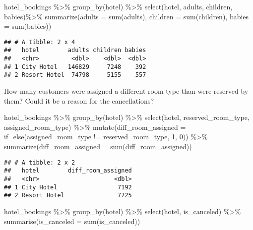 \documentclass[
]{article}
\newenvironment{Shaded}{\begin{snugshade}}{\end{snugshade}}
\newcommand{\AttributeTok}[1]{\textcolor[rgb]{0.77,0.63,0.00}{#1}}
\newcommand{\DecValTok}[1]{\textcolor[rgb]{0.00,0.00,0.81}{#1}}
\newcommand{\FunctionTok}[1]{\textcolor[rgb]{0.00,0.00,0.00}{#1}}
\newcommand{\NormalTok}[1]{#1}
\newcommand{\SpecialCharTok}[1]{\textcolor[rgb]{0.00,0.00,0.00}{#1}}
\begin{document}
\begin{Shaded}
\begin{Highlighting}[]
\NormalTok{hotel\_bookings }\SpecialCharTok{\%\textgreater{}\%} \FunctionTok{group\_by}\NormalTok{(hotel) }\SpecialCharTok{\%\textgreater{}\%} \FunctionTok{select}\NormalTok{(hotel, adults, children, babies)}\SpecialCharTok{\%\textgreater{}\%} \FunctionTok{summarize}\NormalTok{(}\AttributeTok{adults =} \FunctionTok{sum}\NormalTok{(adults), }\AttributeTok{children =} \FunctionTok{sum}\NormalTok{(children), }\AttributeTok{babies =} \FunctionTok{sum}\NormalTok{(babies))}
\end{Highlighting}
\end{Shaded}

\begin{verbatim}
## # A tibble: 2 x 4
##   hotel        adults children babies
##   <chr>         <dbl>    <dbl>  <dbl>
## 1 City Hotel   146829     7248    392
## 2 Resort Hotel  74798     5155    557
\end{verbatim}

How many customers were assigned a different room type than were
reserved by them? Could it be a reason for the cancellations?

\begin{Shaded}
\begin{Highlighting}[]
\NormalTok{hotel\_bookings }\SpecialCharTok{\%\textgreater{}\%} \FunctionTok{group\_by}\NormalTok{(hotel) }\SpecialCharTok{\%\textgreater{}\%} \FunctionTok{select}\NormalTok{(hotel, reserved\_room\_type, assigned\_room\_type) }\SpecialCharTok{\%\textgreater{}\%} \FunctionTok{mutate}\NormalTok{(}\AttributeTok{diff\_room\_assigned =} \FunctionTok{if\_else}\NormalTok{(assigned\_room\_type }\SpecialCharTok{!=}\NormalTok{ reserved\_room\_type, }\DecValTok{1}\NormalTok{, }\DecValTok{0}\NormalTok{)) }\SpecialCharTok{\%\textgreater{}\%} \FunctionTok{summarize}\NormalTok{(}\AttributeTok{diff\_room\_assigned =} \FunctionTok{sum}\NormalTok{(diff\_room\_assigned))}
\end{Highlighting}
\end{Shaded}

\begin{verbatim}
## # A tibble: 2 x 2
##   hotel        diff_room_assigned
##   <chr>                     <dbl>
## 1 City Hotel                 7192
## 2 Resort Hotel               7725
\end{verbatim}

\begin{Shaded}
\begin{Highlighting}[]
\NormalTok{hotel\_bookings }\SpecialCharTok{\%\textgreater{}\%} \FunctionTok{group\_by}\NormalTok{(hotel) }\SpecialCharTok{\%\textgreater{}\%} \FunctionTok{select}\NormalTok{(hotel, is\_canceled) }\SpecialCharTok{\%\textgreater{}\%} \FunctionTok{summarise}\NormalTok{(}\AttributeTok{is\_canceled =} \FunctionTok{sum}\NormalTok{(is\_canceled)) }
\end{Highlighting}
\end{Shaded}
\end{document}
